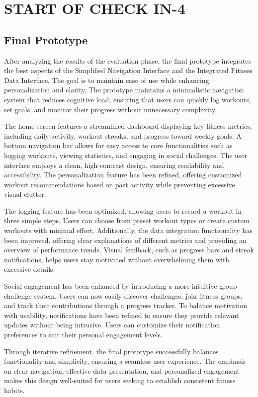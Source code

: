 \documentclass[
	letterpaper, %
]{jdf}
\begin{document}
\section{START OF CHECK IN-4}
\subsection{Final Prototype}
After analyzing the results of the evaluation phase, the final prototype integrates the best aspects of the Simplified Navigation Interface and the Integrated Fitness Data Interface. The goal is to maintain ease of use while enhancing personalization and clarity. The prototype maintains a minimalistic navigation system that reduces cognitive load, ensuring that users can quickly log workouts, set goals, and monitor their progress without unnecessary complexity.

The home screen features a streamlined dashboard displaying key fitness metrics, including daily activity, workout streaks, and progress toward weekly goals. A bottom navigation bar allows for easy access to core functionalities such as logging workouts, viewing statistics, and engaging in social challenges. The user interface employs a clean, high-contrast design, ensuring readability and accessibility. The personalization feature has been refined, offering customized workout recommendations based on past activity while preventing excessive visual clutter.

The logging feature has been optimized, allowing users to record a workout in three simple steps. Users can choose from preset workout types or create custom workouts with minimal effort. Additionally, the data integration functionality has been improved, offering clear explanations of different metrics and providing an overview of performance trends. Visual feedback, such as progress bars and streak notifications, helps users stay motivated without overwhelming them with excessive details.

Social engagement has been enhanced by introducing a more intuitive group challenge system. Users can now easily discover challenges, join fitness groups, and track their contributions through a progress tracker. To balance motivation with usability, notifications have been refined to ensure they provide relevant updates without being intrusive. Users can customize their notification preferences to suit their personal engagement levels.

Through iterative refinement, the final prototype successfully balances functionality and simplicity, ensuring a seamless user experience. The emphasis on clear navigation, effective data presentation, and personalized engagement makes this design well-suited for users seeking to establish consistent fitness habits.
\end{document}
